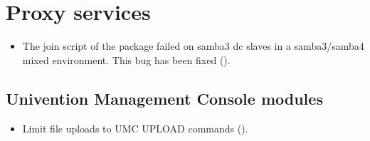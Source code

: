 \section{Proxy services}
\begin{itemize}
\item The join script of the package  failed
on samba3 dc slaves in a samba3/samba4 mixed environment. This bug has been
fixed ().
\end{itemize}


%




\subsection{Univention Management Console modules}
\begin{itemize}
\item Limit file uploads to UMC UPLOAD commands ().
\end{itemize}

